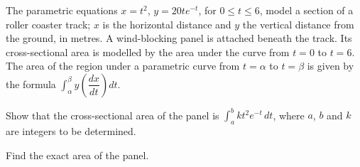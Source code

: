 \documentclass[a4paper,11pt]{book}
\begin{document}
The parametric equations $x = t^2$, $y = 20te^{-t}$, for $0 \leq t \leq 6$, model a section of a roller coaster track; $x$ is the horizontal distance and $y$ the vertical distance from the ground, in metres. A wind-blocking panel is attached beneath the track. Its cross-sectional area is modelled by the area under the curve from $t = 0$ to $t = 6$. The area of the region under a parametric curve from $t = \alpha$ to $t = \beta$ is given by the formula $\displaystyle\int_{\alpha}^{\beta} y\left(\dfrac{dx}{dt}\right) dt$.
\begin{parts}
\item[(i)] Show that the cross-sectional area of the panel is $\displaystyle\int_a^b kt^2e^{-t}\,dt$, where $a$, $b$ and $k$ are integers to be determined. 
\item[(ii)] Find the exact area of the panel. 
\end{parts}
\end{document}

